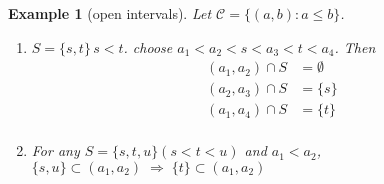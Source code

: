 \documentclass[10pt]{article}
\newtheorem{example}[ex]{Example}
\newcommand{\C}{\ensuremath{\mathcal{C}}}
\newcommand{\then}{\ensuremath{\;\Rightarrow\;}}
\begin{document}
\begin{example}[open intervals]
  Let $\C=\{(a,b):a\leq b\}$.
\begin{enumerate}
  \item $S=\{s,t\}\, s<t$.  choose $a_1<a_2<s<a_3<t<a_4$.
Then \begin{align} (a_1,a_2)\cap S&=\emptyset\\
(a_2,a_3)\cap S&=\{s\}\\
(a_1,a_4)\cap S&=\{t\}\\
\end{align}
\item For any $S=\{s,t,u\} (s<t<u)$ and $a_1<a_2$,\\
 $ \{s,u\}\subset(a_1,a_2) \then \{t\}\subset(a_1,a_2)$
\end{enumerate}
\end{example}

\end{document}
